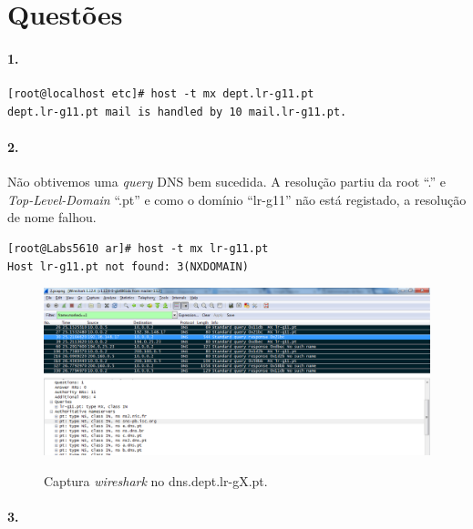 \section*{Questões}
\paragraph{1.}

\begin{verbatim}
[root@localhost etc]# host -t mx dept.lr-g11.pt
dept.lr-g11.pt mail is handled by 10 mail.lr-g11.pt.
\end{verbatim}


\paragraph{2.}
Não obtivemos uma \emph{query} DNS bem sucedida.
A resolução partiu da \textsf{root} \textsf{``.''} e \emph{Top-Level-Domain} \textsf{``.pt''} e como o domínio \textsf{``lr-g11''} não está registado,
a resolução de nome falhou.

\begin{verbatim}
[root@Labs5610 ar]# host -t mx lr-g11.pt
Host lr-g11.pt not found: 3(NXDOMAIN)
\end{verbatim} 

\begin{figure}[h]
\centering
\includegraphics[width=1\textwidth, height=0.33\textheight]{2_cap.png}
\label{fig:2-capturaWireshark}
\caption{Captura \emph{wireshark} no \textsf{dns.dept.lr-gX.pt}.}
\end{figure}


\paragraph{3.}

